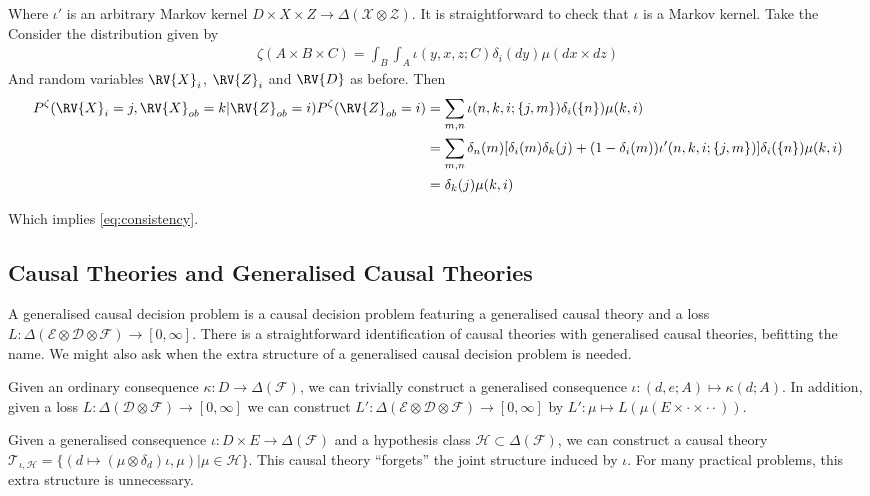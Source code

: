 Where $\iota'$ is an arbitrary Markov kernel $D\times X\times Z\to \Delta(\mathcal{X}\otimes\mathcal{Z})$. It is straightforward to check that $\iota$ is a Markov kernel. Take the Consider the distribution given by
\begin{align}
    \zeta (A\times B\times C) =  \int_B \int_A  \iota(y,x,z; C) \delta_i(dy) \mu(dx\times dz)
\end{align}
And random variables $\RV{X}_i$, $\RV{Z}_i$ and $\RV{D}$ as before. Then
\begin{align}
    P^\zeta(\RV{X}_i=j,\RV{X}_{ob}=k|\RV{Z}_{ob}=i)P^\zeta(\RV{Z}_{ob}=i) &= \sum_{m,n} \iota(n,k,i;\{j,m\}) \delta_i(\{n\}) \mu(k,i)\\
     &= \sum_{m,n} \delta_n(m)[\delta_i(m) \delta_k(j) + (1-\delta_i(m))\iota'(n,k,i;\{j,m\})]\delta_i(\{n\}) \mu(k,i)\\
     &= \delta_k(j) \mu(k,i)
\end{align}

Which implies \ref{eq:consistency}.

\subsection{Causal Theories and Generalised Causal Theories}


A generalised causal decision problem is a causal decision problem featuring a generalised causal theory and a loss $L:\Delta(\mathcal{E}\otimes\mathcal{D}\otimes\mathcal{F})\to[0,\infty]$. There is a straightforward identification of causal theories with generalised causal theories, befitting the name. We might also ask when the extra structure of a generalised causal decision problem is needed.

Given an ordinary consequence $\kappa:D\to \Delta(\mathcal{F})$, we can trivially construct a generalised consequence $\iota:(d,e;A)\mapsto \kappa(d;A)$. In addition, given a loss $L:\Delta(\mathcal{D}\otimes\mathcal{F})\to[0,\infty]$ we can construct $L':\Delta(\mathcal{E}\otimes \mathcal{D}\otimes\mathcal{F})\to[0,\infty]$ by $L':\mu\mapsto L(\mu(E\times \cdot \times \cdot \cdot))$.

Given a generalised consequence $\iota:D\times E\to \Delta(\mathcal{F})$ and a hypothesis class $\mathscr{H}\subset\Delta(\mathcal{F})$, we can construct a causal theory $\mathscr{T}_{\iota,\mathscr{H}} = \{(d\mapsto (\mu\otimes \delta_d)\iota,\mu)|\mu\in \mathscr{H}\}$. This causal theory ``forgets'' the joint structure induced by $\iota$. For many practical problems, this extra structure is unnecessary.

